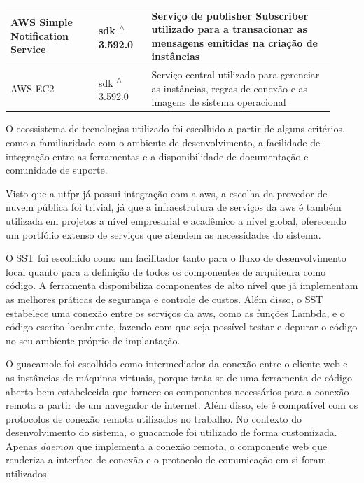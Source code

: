 \begin{longtable}{p{0.25\linewidth} p{0.15\linewidth} p{0.525\linewidth}}
\hline

AWS Simple Notification Service \citep{awssnsdocs} & sdk \textsuperscript{$\wedge$}3.592.0 & Serviço de publisher Subscriber utilizado para a transacionar as mensagens emitidas na criação de instâncias \\

\hline

AWS EC2 \citep{awsec2docs} & sdk \textsuperscript{$\wedge$}3.592.0 & Serviço central utilizado para gerenciar as instâncias, regras de conexão e as imagens de sistema operacional \\

\hline

\end{longtable}

O ecossistema de tecnologias utilizado foi escolhido a partir de alguns critérios, como a familiaridade com o ambiente de desenvolvimento, a facilidade de integração entre as ferramentas e a disponibilidade de documentação e comunidade de suporte.

Visto que a \gls{utfpr} já possui integração com a \gls{aws}, a escolha da provedor de nuvem pública foi trivial, já que a infraestrutura de serviços da \gls{aws} é também utilizada em projetos a nível empresarial e acadêmico a nível global, oferecendo um portfólio extenso de serviços que atendem as necessidades do sistema.

O SST foi escolhido como um facilitador tanto para o fluxo de desenvolvimento local quanto para a definição de todos os componentes de arquiteura como código. A ferramenta disponibiliza componentes de alto nível que já implementam as melhores práticas de segurança e controle de custos. Além disso, o SST estabelece uma conexão entre os serviços da \gls{aws}, como as funções Lambda, e o código escrito localmente, fazendo com que seja possível testar e depurar o código no seu ambiente próprio de implantação.

O \gls{guacamole} foi escolhido como intermediador da conexão entre o cliente web e as instâncias de máquinas virtuais, porque trata-se de uma ferramenta de código aberto bem estabelecida que fornece os componentes necessários para a conexão remota a partir de um navegador de internet. Além disso, ele é compatível com os protocolos de conexão remota utilizados no trabalho. No contexto do desenvolvimento do sistema, o \gls{guacamole} foi utilizado de forma customizada. Apenas \textit{daemon} que implementa a conexão remota, o componente web que renderiza a interface de conexão e o protocolo de comunicação em si foram utilizados.

